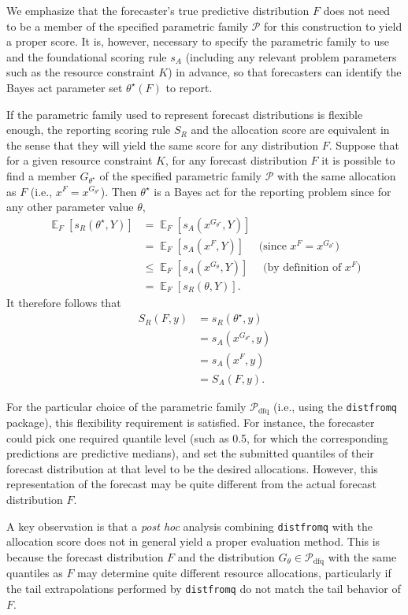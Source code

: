 \documentclass{article}\usepackage[]{graphicx}\usepackage[]{xcolor}
\DeclareMathOperator{\Ex}{\mathbb{E}}
\begin{document}
We emphasize that the forecaster's true predictive distribution $F$ does not need to be a member of the specified parametric family $\mathcal{P}$ for this construction to yield a proper score.
It is, however, necessary to specify the parametric family to use and the foundational scoring rule $s_A$ (including any relevant problem parameters such as the resource constraint $K$) in advance, so that forecasters can identify the Bayes act parameter set $\theta^\star(F)$ to report.

If the parametric family used to represent forecast distributions is flexible enough, the reporting scoring rule $S_R$ and the allocation score are equivalent in the sense that they will yield the same score for any distribution $F$.
Suppose that for a given resource constraint $K$, for any forecast distribution $F$ it is possible to find a member $G_{\theta^\star}$ of the specified parametric family $\mathcal{P}$ with the same allocation as $F$ (i.e., $x^F = x^{G_{\theta^\star}}$). Then $\theta^\star$ is a Bayes act for the reporting problem since for any other parameter value $\theta$,
\begin{align*}
\Ex_F[s_R(\theta^\star, Y)] &= \Ex_F[ s_A(x^{G_{\theta^\star}}, Y) ] \\
&= \Ex_F[s_A(x^F, Y)]  \quad \text{ (since $x^F = x^{G_{\theta^\star}}$)} \\
&\leq \Ex_F[ s_A(x^{G_\theta}, Y) ]  \quad \text{ (by definition of $x^F$)} \\
&= \Ex_F[ s_R(\theta, Y)].
\end{align*}
It therefore follows that
\begin{align*}
S_R(F, y) &= s_R(\theta^\star, y) \\
&= s_A(x^{G_{\theta^\star}}, y) \\
&= s_A(x^F, y) \\
&= S_A(F, y).
\end{align*}

For the particular choice of the parametric family $\mathcal{P}_{\text{dfq}}$ (i.e., using the \verb`distfromq` package), this flexibility requirement is satisfied. For instance, the forecaster could pick one required quantile level (such as 0.5, for which the corresponding predictions are predictive medians), and set the submitted quantiles of their forecast distribution at that level to be the desired allocations.
However, this representation of the forecast may be quite different from the actual forecast distribution $F$.

A key observation is that a \emph{post hoc} analysis combining \verb`distfromq` with the allocation score does not in general yield a proper evaluation method. This is because the forecast distribution $F$ and the distribution $G_\theta \in \mathcal{P}_{\text{dfq}}$ with the same quantiles as $F$ may determine quite different resource allocations, particularly if the tail extrapolations performed by \verb`distfromq` do not match the tail behavior of $F$.
\end{document}
